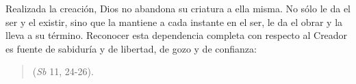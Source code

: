 	
	 Realizada la creación, Dios no abandona su criatura a ella misma. No sólo le da el ser y el existir, sino que la mantiene a cada instante en el ser, le da el obrar y la lleva a su término. Reconocer esta dependencia completa con respecto al Creador es fuente de sabiduría y de libertad, de gozo y de confianza:
	
	\begin{quote}
		 (\emph{Sb} 11, 24-26).
	\end{quote}
	
	